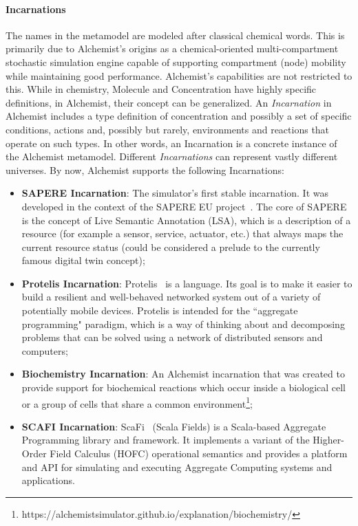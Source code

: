 \paragraph{Incarnations} The names in the metamodel are modeled after classical chemical words. This is primarily due to Alchemist's origins as a chemical-oriented multi-compartment stochastic simulation engine capable of supporting compartment (node) mobility while maintaining good performance. Alchemist's capabilities are not restricted to this. While in chemistry, Molecule and Concentration have highly specific definitions, in Alchemist, their concept can be generalized. An \textit{Incarnation} in Alchemist includes a type definition of concentration and possibly a set of specific conditions, actions and, possibly but rarely, environments and reactions that operate on such types. In other words, an Incarnation is a concrete instance of the Alchemist metamodel.\newline
Different \textit{Incarnations} can represent vastly different universes. By now, Alchemist supports the following Incarnations:
\begin{itemize}
	\item \textbf{SAPERE Incarnation}: The simulator's first stable incarnation. It was developed in the context of the SAPERE EU project~\cite{sapere}. The core of SAPERE is the concept of Live Semantic Annotation (LSA), which is a description of a resource (for example a sensor, service, actuator, etc.) that always maps the current resource status (could be considered a prelude to the currently famous digital twin concept);
	\item \textbf{Protelis Incarnation}: Protelis~\cite{protelis} is a language. Its goal is to make it easier to build a resilient and well-behaved networked system out of a variety of potentially mobile devices. Protelis is intended for the ``aggregate programming" paradigm, which is a way of thinking about and decomposing problems that can be solved using a network of distributed sensors and computers;
	\item \textbf{Biochemistry Incarnation}: An Alchemist incarnation that was created to provide support for biochemical reactions which occur inside a biological cell or a group of cells that share a common environment\footnote{https://alchemistsimulator.github.io/explanation/biochemistry/};
	\item \textbf{SCAFI Incarnation}: ScaFi~\cite{CASADEI2022101248} (Scala Fields) is a Scala-based Aggregate Programming library and framework. It implements a variant of the Higher-Order Field Calculus (HOFC) operational semantics and provides a platform and API for simulating and executing Aggregate Computing systems and applications.
\end{itemize}


